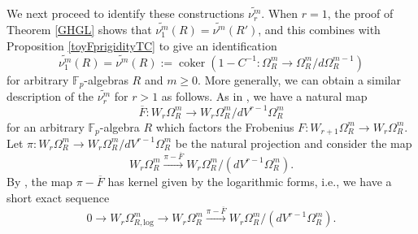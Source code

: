 \documentclass{amsart}
\theoremstyle{definition}
\begin{document}
We next proceed to identify these 
constructions $\widetilde{\nu^{m}_r}$. 
When $r=1$, the proof of Theorem \ref{GHGL} shows that
$\widetilde{\nu^m_1}(R)= \widetilde{\nu^m}(R')$, and this combines with Proposition \ref{toyFprigidityTC} to give an identification
$$\widetilde{\nu^m_1}(R)= \widetilde{\nu^m}(R):=\operatorname{coker}( 1 - C^{-1}: \Omega^m_R \to \Omega^m_R / d \Omega^{m-1}_R)$$
for arbitrary $\mathbb{F}_p$-algebras $R$ and $m \geq 0$.  
More generally, we can obtain a similar description of the
$\widetilde{\nu_r^m}$ for $r> 1$ as follows. 
As in \cite[Sec.~4]{Morrow-HW}, 
we have a natural map 
\[ \overline{F}: W_r \Omega_R^{m} \to W_r \Omega_R^{m}/ d V^{r-1}
\Omega_R^{m}  \]
for an arbitrary $\mathbb{F}_p$-algebra $R$ which factors the Frobenius $F: W_{r+1}
\Omega_R^{m} \to W_r \Omega_R^{m}$.  Let $\pi: W_r \Omega_R^{m} \to 
 W_r \Omega_R^{m}/ d V^{r-1} \Omega_R^{m}$ be the natural projection and 
consider the map 
 \begin{equation} \label{piminusF} W _r \Omega_R^{m} \xrightarrow{\pi - \overline{F}}  
 W_r \Omega_R^{m}/ (d V^{r-1} \Omega_R^{m})
.\end{equation} 
By \cite[Cor. 4.2(iii)]{Morrow-HW}, the map $\pi - \overline{F}$
has kernel given by the logarithmic forms, i.e., we have a short exact sequence 
 \begin{equation} \label{piminusF2} 
 0 \to 
W_r \Omega_{R, \mathrm{log}}^{m} \to 
 W _r \Omega_R^{m} \xrightarrow{\pi - \overline{F}}  
 W_r \Omega_R^{m}/ (d V^{r-1} \Omega_R^{m})
.\end{equation} 
\end{document}
